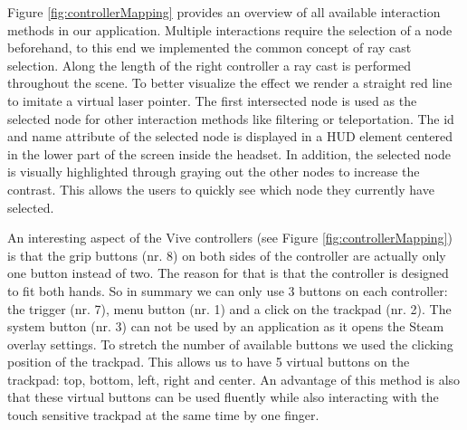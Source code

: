 Figure \ref{fig:controllerMapping} provides an overview of all available interaction methods in our application. Multiple interactions require the selection of a node beforehand, to this end we implemented the common concept of ray cast selection. 
Along the length of the right controller a ray cast is performed throughout the scene. To better visualize the effect we render a straight red line to imitate a virtual laser pointer.
The first intersected node is used as the selected node for other interaction methods like filtering or teleportation. The id and name attribute of the selected node is displayed in a HUD element centered in the lower part of the screen inside the headset. In addition, the selected node is visually highlighted through graying out the other nodes to increase the contrast. This allows the users to quickly see which node they currently have selected.

An interesting aspect of the Vive controllers (see Figure \ref{fig:controllerMapping}) is that the grip buttons (nr. 8) on both sides of the controller are actually only one button instead of two. The reason for that is that the controller is designed to fit both hands. 
So in summary we can only use 3 buttons on each controller: the trigger (nr. 7), menu button (nr. 1) and a click on the trackpad (nr. 2). The system button (nr. 3) can not be used by an application as it opens the Steam overlay settings. To stretch the number of available buttons we used the clicking position of the trackpad. This allows us to have 5 virtual buttons on the trackpad: top, bottom, left, right and center. An advantage of this method is also that these virtual buttons can be used fluently while also interacting with the touch sensitive trackpad at the same time by one finger. 

